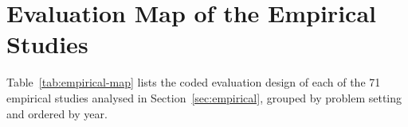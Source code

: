 \section{Evaluation Map of the Empirical Studies}
\label{app:empirical-map}

Table~\ref{tab:empirical-map} lists the coded evaluation design of each of the 71 empirical studies analysed in Section~\ref{sec:empirical}, grouped by problem setting and ordered by year.

